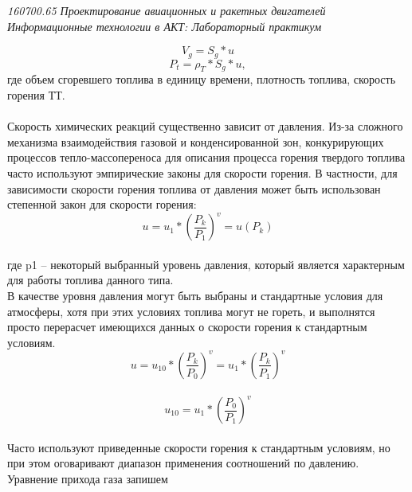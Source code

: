 \begin{flushright}
\begin{scriptsize}
\textit{160700.65   Проектирование авиационных и ракетных двигателей\\
 Информационные технологии в АКТ: Лабораторный практикум} \\
\end{scriptsize}
\end{flushright}
\begin{equation}\label{eq:fourierrow} 
V_g = S_g * u 
\end{equation}
\begin{equation}\label{eq:fourierrow} 
P_t = \rho_T * S_g * u,
\end{equation}
где объем сгоревшего топлива в единицу времени, плотность топлива, скорость горения ТТ.\\
~\\
Скорость химических реакций существенно зависит от давления. Из-за сложного механизма взаимодействия газовой и конденсированной зон, конкурирующих процессов тепло-массопереноса для описания процесса горения твердого топлива часто используют эмпирические законы для скорости горения. В частности, для зависимости скорости горения топлива от давления может быть использован степенной закон для скорости горения:\\
\begin{equation}\label{eq:fourierrow} 
u = u_1 * {(\frac{P_k}{P_1})}^v = u(P_k)
\end{equation}\\
где p1 – некоторый выбранный уровень давления, который является характерным для работы топлива данного типа.\\
В качестве уровня давления могут быть выбраны и стандартные условия для атмосферы, хотя при этих условиях топлива могут не гореть, и выполнятся просто перерасчет имеющихся данных о скорости горения к стандартным условиям. \\
\begin{equation}\label{eq:fourierrow} 
u = u_{10} * {(\frac{P_k}{P_0})}^v = u_1 * {(\frac{P_k}{P_1})}^v
\end{equation}\\
\begin{equation}\label{eq:fourierrow} 
u_{10} = u_1 * {(\frac{P_0}{P_1})}^v
\end{equation}\\
Часто используют приведенные скорости горения к стандартным условиям, но при этом оговаривают диапазон применения соотношений по давлению. Уравнение прихода газа запишем \\
